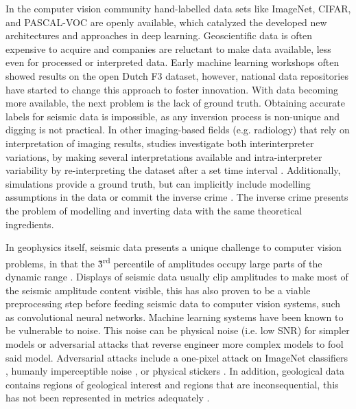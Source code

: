 

In the computer vision community hand-labelled data sets like ImageNet, CIFAR, and PASCAL-VOC are openly available, which catalyzed the developed new architectures and approaches in deep learning. Geoscientific data is often expensive to acquire and companies are reluctant to make data available, less even for processed or interpreted data. Early machine learning workshops often showed results on the open Dutch F3 dataset, however, national data repositories have started to change this approach to foster innovation. With data becoming more available, the next problem is the lack of ground truth. Obtaining accurate labels for seismic data is impossible, as any inversion process is non-unique and digging is not practical. In other imaging-based fields (e.g. radiology) that rely on interpretation of imaging results, studies investigate both interinterpreter variations, by making several interpretations available and intra-interpreter variability by re-interpreting the dataset after a set time interval \citep{macerlean2013, alikhassi2018comparison,al2010inter}. Additionally, simulations provide a ground truth, but can implicitly include modelling assumptions in the data or commit the inverse crime \citep{wirgin2004inverse}. The inverse crime presents the problem of modelling and inverting data with the same theoretical ingredients.


In geophysics itself, seismic data presents a unique challenge to computer vision problems, in that the \~3\textsuperscript{rd} percentile of amplitudes occupy large parts of the dynamic range \citep{forel2005seismic}. Displays of seismic data usually clip amplitudes to make most of the seismic amplitude content visible, this has also proven to be a viable preprocessing step before feeding seismic data to computer vision systems, such as convolutional neural networks. Machine learning systems have been known to be vulnerable to noise. This noise can be physical noise (i.e. low SNR) for simpler models or adversarial attacks that reverse engineer more complex models to fool said model. Adversarial attacks include a one-pixel attack on ImageNet classifiers \citep{su2019one}, humanly imperceptible noise \citep{goodfellow2014explaining}, or physical stickers \citep{brown2017adversarial}. In addition, geological data contains regions of geological interest and regions that are inconsequential, this has not been represented in metrics adequately \citep{purves2019towards}.

